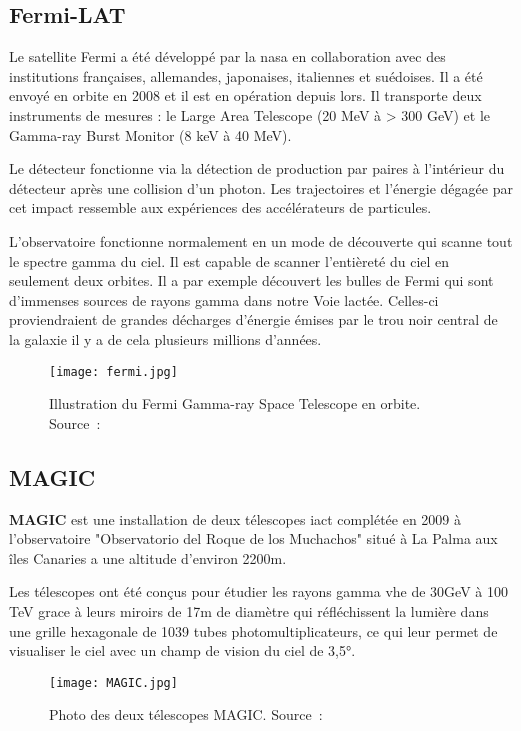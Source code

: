 \subsection{Fermi-LAT}
Le satellite Fermi a été développé par la \gls{nasa} en collaboration avec des institutions
françaises, allemandes, japonaises, italiennes et suédoises. Il a été envoyé en orbite en 2008 et il est en opération depuis lors. \cite{Fermi}
Il transporte deux instruments de mesures : le Large Area Telescope (20 MeV à > 300 GeV) et le Gamma-ray Burst Monitor (8 keV à 40 MeV).

Le détecteur fonctionne via la détection de production par paires à l'intérieur du détecteur après une collision d'un photon.
Les trajectoires et l'énergie dégagée par cet impact ressemble aux expériences des accélérateurs de particules.

L'observatoire fonctionne normalement en un mode de découverte qui scanne tout le spectre gamma du ciel.
Il est capable de scanner l'entièreté du ciel en seulement deux orbites.
Il a par exemple découvert les bulles de Fermi qui sont d'immenses sources de rayons gamma dans notre Voie lactée. 
Celles-ci proviendraient de grandes décharges d'énergie émises par le trou noir central de la galaxie il y a de cela plusieurs millions d'années.

\begin{figure}[tbph!]
	\centering
	\texttt{[image: fermi.jpg]}
	\caption[Illustration du Fermi Gamma-ray Space Telescope en orbite]{Illustration du Fermi Gamma-ray Space Telescope en orbite. Source : \cite{FermiImage}}
\end{figure}

\subsection{MAGIC}
\textbf{MAGIC} est une installation de deux télescopes \gls{iact} complétée en 2009 à l'observatoire "Observatorio del Roque de los Muchachos" situé à La Palma aux îles
Canaries a une altitude d'environ 2200m. \cite{Magic}

Les télescopes ont été conçus pour étudier les rayons gamma \gls{vhe} de 30GeV à 100 TeV grace à leurs miroirs de 17m de diamètre qui réfléchissent la lumière dans
une grille hexagonale de 1039 tubes photomultiplicateurs, ce qui leur permet de visualiser le ciel avec un champ de vision du ciel de 3,5°.

\begin{figure}[tbph!]
	\centering
	\texttt{[image: MAGIC.jpg]}
	\caption[Photo des deux télescopes MAGIC]{Photo des deux télescopes MAGIC. Source : \cite{MagicImage}}
\end{figure}

